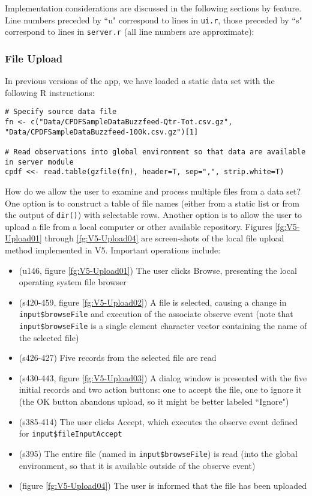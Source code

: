 \documentclass[10pt, letterpaper]{article}
\begin{document}
\begin{spacing}{1.0}
Implementation considerations are discussed in the following sections by feature.  Line numbers preceded by ``u" correspond to lines in \texttt{ui.r}, those preceded by ``s" correspond to lines in \texttt{server.r} (all line numbers are approximate):

\clearpage

\subsubsection{File Upload}

In previous versions of the app, we have loaded a static data set with the following R instructions:

\small
\begin{verbatim}
# Specify source data file
fn <- c("Data/CPDFSampleDataBuzzfeed-Qtr-Tot.csv.gz", "Data/CPDFSampleDataBuzzfeed-100k.csv.gz")[1]

# Read observations into global environment so that data are available in server module
cpdf <<- read.table(gzfile(fn), header=T, sep=",", strip.white=T)
\end{verbatim}
\normalsize

How do we allow the user to examine and process multiple files from a data set?  One option is to construct a table of file names (either from a static list or from the output of \texttt{dir()}) with selectable rows.  Another option is to allow the user to upload a file from a local computer or other available repository.  Figures \ref{fg:V5-Upload01} through \ref{fg:V5-Upload04} are screen-shots of the local file upload method implemented in V5.  Important operations include:

\begin{itemize}
    \item (u146, figure \ref{fg:V5-Upload01}) The user clicks Browse, presenting the local operating system file browser
    \item (s420-459, figure \ref{fg:V5-Upload02}) A file is selected, causing a change in \texttt{input\$browseFile} and execution of the associate observe event (note that \texttt{input\$browseFile} is a single element character vector containing the name of the selected file)
    \item (s426-427) Five records from the selected file are read
    \item (s430-443, figure \ref{fg:V5-Upload03}) A dialog window is presented with the five initial records and two action buttons:  one to accept the file, one to ignore it (the OK button abandons upload, so it might be better labeled ``Ignore")
    \item (s385-414) The user clicks Accept, which executes the observe event defined for \texttt{input\$fileInputAccept}
    \item (s395) The entire file (named in \texttt{input\$browseFile}) is read (into the global environment, so that it is available outside of the observe event)
    \item (figure \ref{fg:V5-Upload04}) The user is informed that the file has been uploaded
\end{itemize}


\end{spacing}
\end{document}
